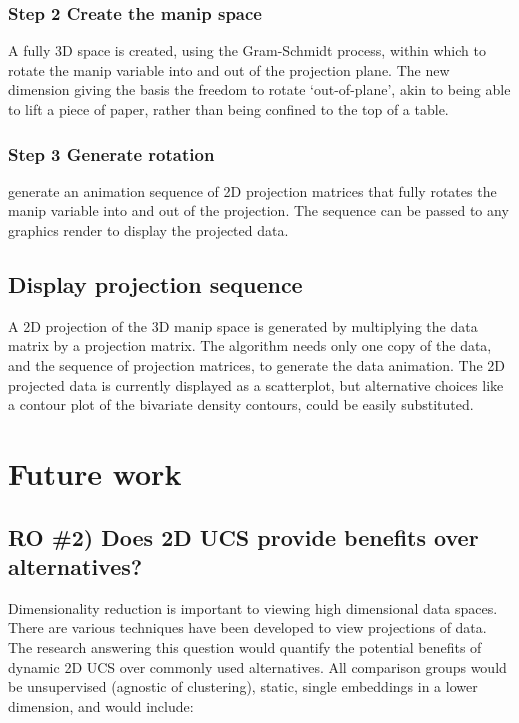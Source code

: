 \documentclass{monashthesis}
\begin{document}
\subsection{Step 2 Create the manip
space}\label{step-2-create-the-manip-space}

A fully 3D space is created, using the Gram-Schmidt process, within
which to rotate the manip variable into and out of the projection plane.
The new dimension giving the basis the freedom to rotate `out-of-plane',
akin to being able to lift a piece of paper, rather than being confined
to the top of a table.

\subsection{Step 3 Generate rotation}\label{step-3-generate-rotation}

generate an animation sequence of 2D projection matrices that fully
rotates the manip variable into and out of the projection. The sequence
can be passed to any graphics render to display the projected data.

\section{Display projection sequence}\label{display-projection-sequence}

A 2D projection of the 3D manip space is generated by multiplying the
data matrix by a projection matrix. The algorithm needs only one copy of
the data, and the sequence of projection matrices, to generate the data
animation. The 2D projected data is currently displayed as a
scatterplot, but alternative choices like a contour plot of the
bivariate density contours, could be easily substituted.

\chapter{Future work}\label{ch:future_work}

\section{RO \#2) Does 2D UCS provide benefits over
alternatives?}\label{ro-2-does-2d-ucs-provide-benefits-over-alternatives}

Dimensionality reduction is important to viewing high dimensional data
spaces. There are various techniques have been developed to view
projections of data. The research answering this question would quantify
the potential benefits of dynamic 2D UCS over commonly used
alternatives. All comparison groups would be unsupervised (agnostic of
clustering), static, single embeddings in a lower dimension, and would
include:
\end{document}
